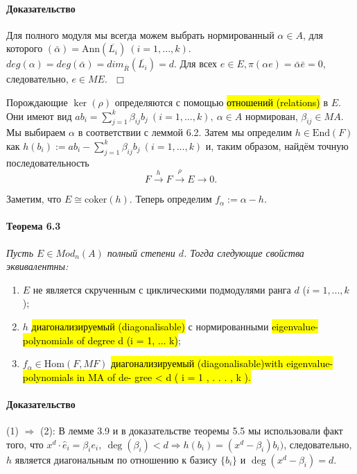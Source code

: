 \documentclass[a4paper,12pt]{article}
\newcommand{\hatei}[1]{\hat{e}_{#1}}
\newcommand{\Ann}{\text{Ann}}
\newcommand{\Endom}{\text{End}}
\newcommand{\coker}{\text{coker}}
\begin{document}
\paragraph{Доказательство}
Для полного модуля мы всегда можем выбрать нормированный $\alpha \in A$, для которого $(\bar{\alpha}) = \Ann (\overline{L_i}) ~ (i = 1,...,k)$. $deg(\alpha) = deg(\bar{\alpha}) = dim_{\overline{R}}(\overline{L_i}) = d$. Для всех $e \in E, \pi(\alpha e) = \bar{\alpha} \bar{e} = 0$, следовательно, $e \in M E. ~~~ \Box$

Порождающие $\ker(\rho)$ определяются с помощью \hl{отношений (relations)} в $E$. Они имеют вид $a b_i = \sum_{j = 1}^{k} \beta_{ij} b_j ~ (i = 1, ..., k), ~ \alpha \in A$ нормирован, $\beta_{ij} \in M A$. Мы выбираем $\alpha$ в соответствии с леммой 6.2. Затем мы определим $h \in \Endom(F)$ как $h(b_i) := a b_i - \sum_{j=1}^{k} \beta_{ij} b_j ~ (i = 1, ..., k)$ и, таким образом, найдём точную последовательность
$$
F \overset{h}{\rightarrow} F \overset{\rho}{\rightarrow} E \rightarrow 0.
$$

Заметим, что $E \cong \coker(h)$. Теперь определим $f_\alpha := \alpha - h$.

\newcommand{\Hom}{\text{Hom}}

\paragraph{Теорема 6.3}
{\itshape Пусть $E \in Mod_n(A)$ полный степени $d$. Тогда следующие свойства эквивалентны:
	\begin{enumerate}
		\item $E$ не является скрученным с циклическими подмодулями ранга $d$ ($i = 1, ..., k$);
		\item $h$ \hl{диагонализируемый (diagonalisable)} с нормированными \hl{eigenvalue-polynomials of degree d (i = 1, ... k)}; %
		\item $f_{\alpha} \in \Hom(F, MF)$ \hl{диагонализируемый (diagonalisable)}\hl{with eigenvalue-polynomials in MA of de-
		gree < d ( i = 1 , . . . , k ).}
	\end{enumerate}

}

\newcommand{\Aut}{\text{Aut}}

\paragraph{Доказательство}
(1) $\Rightarrow$ (2): В лемме 3.9 и в доказательстве теоремы 5.5 мы использовали факт того, что $x^d \cdot \hatei{i} = \beta_i e_i, ~ \deg(\beta_i) < d \Rightarrow h(b_i) = (x^d - \beta_i) b_i)$, следовательно, $h$ является диагональным по отношению к базису $\{b_i\}$ и $\deg(x^d - \beta_i) = d$.
\end{document}
